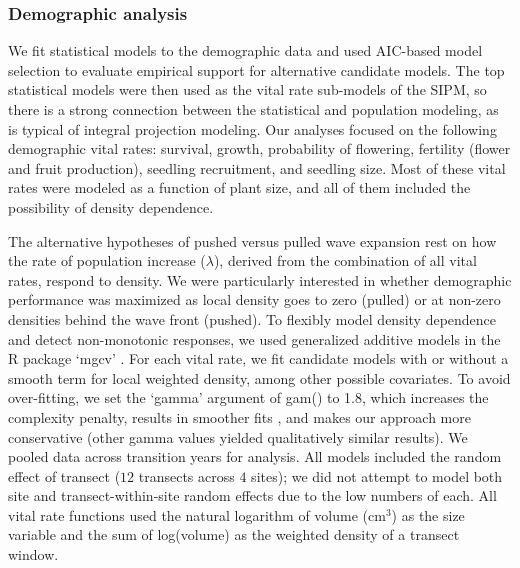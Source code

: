 \documentclass[11pt]{article}\usepackage[]{graphicx}\usepackage[usenames,dvipsnames]{xcolor}
\begin{document}
\subsubsection*{Demographic analysis}
We fit statistical models to the demographic data and used AIC-based model selection to evaluate empirical support for alternative candidate models. 
The top statistical models were then used as the vital rate sub-models of the SIPM, so there is a strong connection between the statistical and population modeling, as is typical of integral projection modeling. 
Our analyses focused on the following demographic vital rates: survival, growth, probability of flowering, fertility (flower and fruit production), seedling recruitment, and seedling size. 
Most of these vital rates were modeled as a function of plant size, and all of them included the possibility of density dependence. 

The alternative hypotheses of pushed versus pulled wave expansion rest on how the rate of population increase ($\lambda$), derived from the combination of all vital rates, respond to density. 
We were particularly interested in whether demographic performance was maximized as local density goes to zero (pulled) or at non-zero densities behind the wave front (pushed). 
To flexibly model density dependence and detect non-monotonic responses, we used generalized additive models in the R package `mgcv' \citep{Wood2017}.
For each vital rate, we fit candidate models with or without a smooth term for local weighted density, among other possible covariates. 
To avoid over-fitting, we set the `gamma' argument of gam() to 1.8, which increases the complexity penalty, results in smoother fits \citep{Wood2017}, and makes our approach more conservative (other gamma values yielded qualitatively similar results).
We pooled data across transition years for analysis. 
All models included the random effect of transect ($12$ transects across $4$ sites); we did not attempt to model both site and transect-within-site random effects due to the low numbers of each. 
All vital rate functions used the natural logarithm of volume (cm$^3$) as the size variable and the sum of log(volume) as the weighted density of a transect window.
\end{document}
